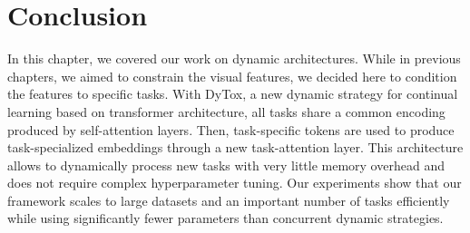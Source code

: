 \section{Conclusion}

In this chapter, we covered our work on dynamic architectures. While in previous chapters, we aimed
to constrain the visual features, we decided here to condition the features to specific tasks. With
DyTox, a new dynamic strategy for continual learning based on transformer architecture, all tasks
share a common encoding produced by self-attention layers. Then, task-specific tokens are used to
produce task-specialized embeddings through a new task-attention layer. This architecture allows
to dynamically process new tasks with very little memory overhead and does not require complex
hyperparameter tuning. Our experiments show that our framework scales to large datasets and an
important number of tasks efficiently while using significantly fewer parameters than concurrent
dynamic strategies.
